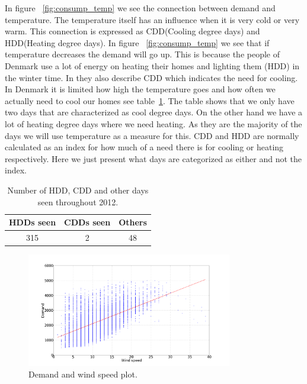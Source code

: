 In figure ~\ref{fig:consump_temp} we see the connection between demand and temperature. The temperature itself has an influence when it is very cold or very warm. This connection is expressed as CDD(Cooling degree days) and HDD(Heating degree days). In figure ~\ref{fig:consump_temp} we see that if temperature decreases the demand will go up. This is because the people of Denmark use a lot of energy on heating their homes and lighting them (HDD) in the winter time. In \cite{19} they also describe CDD which indicates the need for cooling. In Denmark it is limited how high the temperature goes and how often we actually need to cool our homes see table~\ref{table:CDD_HDD}. The table shows that we only have two days that are characterized as cool degree days. On the other hand we have a lot of heating degree days where we need heating. As they are the majority of the days we will use temperature as a measure for this. CDD and HDD are normally calculated as an index for how much of a need there is for cooling or heating respectively. Here we just present what days are categorized as either and not the index.

\begin{table}[H]
\centering
\begin{tabular}{|c|c|c|} 
	\hline
HDDs seen & CDDs seen & Others \\ [0.5ex]
\hline
315 & 2 & 48 \\  \hline
\end{tabular}
\caption{Number of HDD, CDD and other days seen throughout 2012.} %
\label{table:CDD_HDD} %
\end{table}

\begin{figure}[H]
\centering
\includegraphics[width=0.8\textwidth ]{billeder/energy_price_plots/consump_wind.png}
\caption{Demand and wind speed plot.}
\label{fig:consump_wind}
\end{figure}

